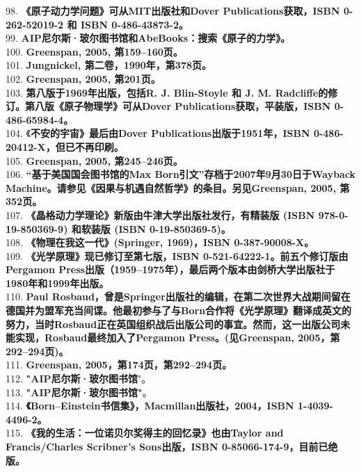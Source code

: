 98. \textbf{《原子动力学问题》可从MIT出版社和Dover Publications获取，ISBN 0-262-52019-2 和 ISBN 0-486-43873-2。}\\
99.  \textbf{AIP尼尔斯·玻尔图书馆和AbeBooks：搜索《原子的力学》。}\\ 
100. \textbf{Greenspan, 2005, 第159–160页。}\\
101. \textbf{Jungnickel, 第二卷，1990年，第378页。}\\ 
102. \textbf{Greenspan, 2005, 第201页。}\\
103. \textbf{第八版于1969年出版，包括R. J. Blin-Stoyle 和 J. M. Radcliffe的修订。第八版《原子物理学》可从Dover Publications获取，平装版，ISBN 0-486-65984-4。}\\
104. 《\textbf{不安的宇宙》最后由Dover Publications出版于1951年，ISBN 0-486-20412-X，但已不再印刷。}\\
105. \textbf{Greenspan, 2005, 第245–246页。}\\
106. \textbf{“基于美国国会图书馆的Max Born引文”存档于2007年9月30日于Wayback Machine。请参见《因果与机遇自然哲学》的条目。另见Greenspan, 2005, 第352页。}\\
107. \textbf{《晶格动力学理论》新版由牛津大学出版社发行，有精装版 (ISBN 978-0-19-850369-9) 和软装版 (ISBN 0-19-850369-5)。}\\ 
108. \textbf{《物理在我这一代》(Springer, 1969)，ISBN 0-387-90008-X。}\\ 
109. \textbf{《光学原理》现已修订至第七版，ISBN 0-521-64222-1。前五个修订版由Pergamon Press出版（1959–1975年），最后两个版本由剑桥大学出版社于1980年和1999年出版。}\\ 
110. \textbf{Paul Rosbaud，曾是Springer出版社的编辑，在第二次世界大战期间留在德国并为盟军充当间谍。他最初参与了与Born合作将《光学原理》翻译成英文的努力，当时Rosbaud正在英国组织战后出版公司的事宜。然而，这一出版公司未能实现，Rosbaud最终加入了Pergamon Press。(见Greenspan, 2005，第292–294页)。} \\
111. \textbf{Greenspan, 2005，第174页，第292–294页。}\\
112. \textbf{"AIP尼尔斯·玻尔图书馆}"。\\
113. \textbf{"AIP尼尔斯·玻尔图书馆"}。\\
114. \textbf{《Born–Einstein书信集》，Macmillan出版社，2004，ISBN 1-4039-4496-2。}\\ 
115. \textbf{《我的生活：一位诺贝尔奖得主的回忆录》也由Taylor and Francis/Charles Scribner's Sons出版，ISBN 0-85066-174-9，目前已绝版。}\\
